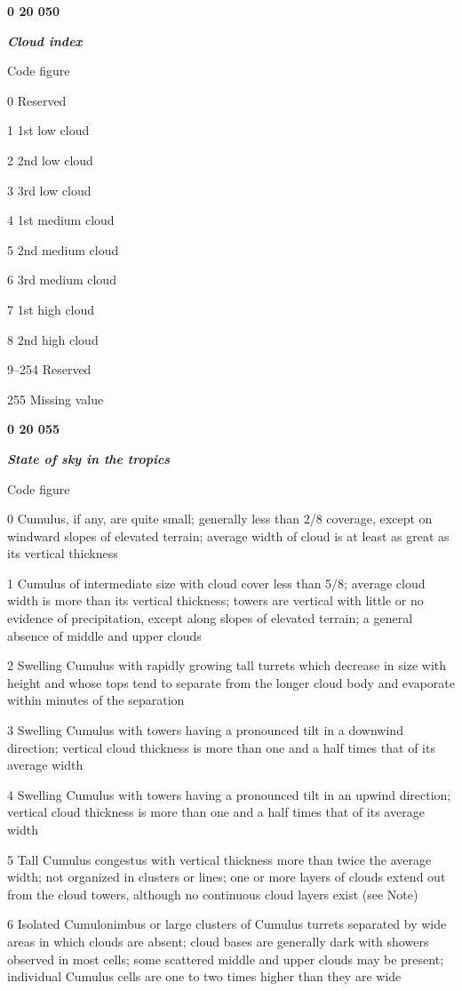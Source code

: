 \textbf{0 20 050}

\emph{\textbf{Cloud index}}

Code figure

0 Reserved

1 1st low cloud

2 2nd low cloud

3 3rd low cloud

4 1st medium cloud

5 2nd medium cloud

6 3rd medium cloud

7 1st high cloud

8 2nd high cloud

9--254 Reserved

255 Missing value

\textbf{0 20 055}

\emph{\textbf{State of sky in the tropics}}

Code figure

0 Cumulus, if any, are quite small; generally less than 2/8 coverage, except on windward slopes of elevated terrain; average width of cloud is at least as great as its vertical thickness

1 Cumulus of intermediate size with cloud cover less than 5/8; average cloud width is more than its vertical thickness; towers are vertical with little or no evidence of precipitation, except along slopes of elevated terrain; a general absence of middle and upper clouds

2 Swelling Cumulus with rapidly growing tall turrets which decrease in size with height and whose tops tend to separate from the longer cloud body and evaporate within minutes of the separation

3 Swelling Cumulus with towers having a pronounced tilt in a downwind direction; vertical cloud thickness is more than one and a half times that of its average width

4 Swelling Cumulus with towers having a pronounced tilt in an upwind direction; vertical cloud thickness is more than one and a half times that of its average width

5 Tall Cumulus congestus with vertical thickness more than twice the average width; not organized in clusters or lines; one or more layers of clouds extend out from the cloud towers, although no continuous cloud layers exist (see Note)

6 Isolated Cumulonimbus or large clusters of Cumulus turrets separated by wide areas in which clouds are absent; cloud bases are generally dark with showers observed in most cells; some scattered middle and upper clouds may be present; individual Cumulus cells are one to two times higher than they are wide

